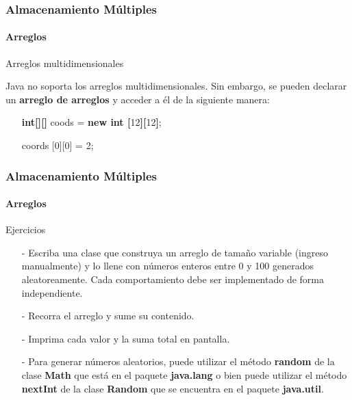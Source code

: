 \documentclass{beamer}
\begin{document}
        \begin{frame}
			\frametitle{Almacenamiento M\'ultiples}
			\framesubtitle{Arreglos}

			\begin{block}{Arreglos multidimensionales}
			    {\scriptsize
				    Java no soporta los arreglos multidimensionales. Sin embargo, se pueden declarar un \textbf{arreglo de arreglos} y acceder a \'el de la siguiente manera:
				    \begin{itemize}
                        \item[] \textbf{int[][]} coods = \textbf{new int [}12\textbf{][}12\textbf{]};
                        \item[] coords [0][0] = 2;
                    \end{itemize}
			    }
			\end{block}
		\end{frame}

        \begin{frame}
			\frametitle{Almacenamiento M\'ultiples}
			\framesubtitle{Arreglos}

			\begin{exampleblock}{Ejercicios}
			    {\scriptsize
				    \begin{itemize}
                        \item[-] Escriba una clase que construya un arreglo de tama\~no variable (ingreso manualmente) y lo llene con n\'umeros enteros entre 0 y 100 generados aleatoreamente. Cada comportamiento debe ser implementado de forma independiente. 
                        \item[-] Recorra el arreglo y sume su contenido. 
                        \item[-] Imprima cada valor y la suma total en pantalla. 
                        \item[-] Para generar n\'umeros aleatorios, puede utilizar el m\'etodo \textbf{random} de la clase \textbf{Math} que est\'a en el paquete \textbf{java.lang} o bien puede utilizar el m\'etodo \textbf{nextInt} de la clase \textbf{Random} que se encuentra en el paquete \textbf{java.util}.
                    \end{itemize}
			    }
			\end{exampleblock}
		\end{frame}
		
\end{document}
